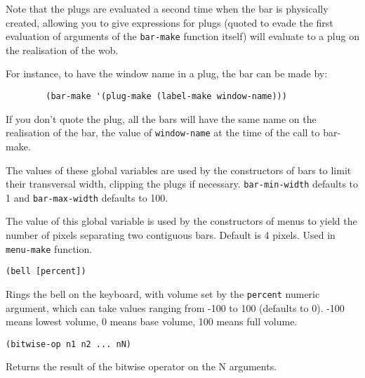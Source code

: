 Note that the plugs are evaluated a second time when the bar is physically
created, allowing you to give expressions for plugs (quoted to evade the
first evaluation of arguments of the \verb"bar-make" function itself)
will evaluate to a plug on the realisation of the wob.  

For instance, to have the window name in a plug, the bar can be made by:
{\exemplefont\begin{verbatim}
        (bar-make '(plug-make (label-make window-name)))
\end{verbatim}}
If you don't quote the plug, all the bars will have the same name on the
realisation of the bar, the value of \verb"window-name" at the time of the
call to bar-make.



The values of these global variables are used by the constructors of bars to
limit their transversal width, clipping the plugs if necessary.
\verb"bar-min-width" defaults to 1 and \verb"bar-max-width" defaults to 100.

        

The value of this global variable is used by the constructors of menus to
yield the number of pixels separating two contiguous bars.  Default is 4
pixels. Used in  \verb"menu-make" function.


{\usagefont\begin{verbatim}
(bell [percent])
\end{verbatim}}\usageupspace

Rings the bell on the keyboard, with volume set by the \verb"percent"
numeric argument, which can take values ranging from -100 to 100 (defaults
to 0). -100 means lowest volume, 0 means base volume, 100 means full volume.

        
{\usagefont\begin{verbatim}
(bitwise-op n1 n2 ... nN)
\end{verbatim}}\usageupspace

Returns the result of the bitwise operator on the N arguments.

